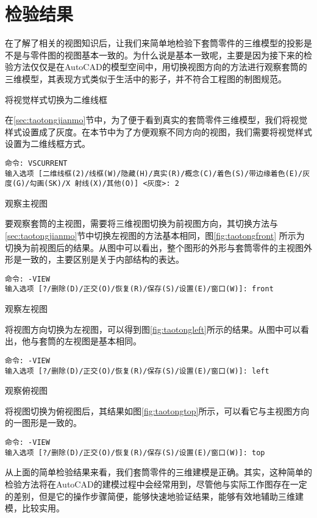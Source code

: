 \section{检验结果}

在了解了相关的视图知识后，让我们来简单地检验下套筒零件的三维模型的投影是不是与零件图的视图基本一致的。为什么说是基本一致呢，主要是因为接下来的检验方法仅仅是在AutoCAD的模型空间中，用切换视图方向的方法进行观察套筒的三维模型，其表现方式类似于生活中的影子，并不符合工程图的制图规范。

\begin{procedure}
\item 将视觉样式切换为二维线框

在\ref{sec:taotongjianmo}节中，为了便于看到真实的套筒零件三维模型，我们将视觉样式设置成了灰度。在本节中为了方便观察不同方向的视图，我们需要将视觉样式设置为二维线框方式。

\begin{lstlisting}
命令: VSCURRENT
输入选项 [二维线框(2)/线框(W)/隐藏(H)/真实(R)/概念(C)/着色(S)/带边缘着色(E)/灰度(G)/勾画(SK)/X 射线(X)/其他(O)] <灰度>: 2
\end{lstlisting}
\item 观察主视图

要观察套筒的主视图，需要将三维视图切换为前视图方向，其切换方法与\ref{sec:taotongjianmo}节中切换左视图的方法基本相同，图\ref{fig:taotongfront} 所示为切换为前视图后的结果。从图中可以看出，整个图形的外形与套筒零件的主视图外形是一致的，主要区别是关于内部结构的表达。

\begin{lstlisting}
命令: -VIEW
输入选项 [?/删除(D)/正交(O)/恢复(R)/保存(S)/设置(E)/窗口(W)]: front
\end{lstlisting}
\item 观察左视图

将视图方向切换为左视图，可以得到图\ref{fig:taotongleft}所示的结果。从图中可以看出，他与套筒的左视图是基本相同。
\begin{lstlisting}
命令: -VIEW
输入选项 [?/删除(D)/正交(O)/恢复(R)/保存(S)/设置(E)/窗口(W)]: left
\end{lstlisting}
\item 观察俯视图

将视图切换为俯视图后，其结果如图\ref{fig:taotongtop}所示，可以看它与主视图方向的一图形是一致的。
\begin{lstlisting}
命令: -VIEW
输入选项 [?/删除(D)/正交(O)/恢复(R)/保存(S)/设置(E)/窗口(W)]: top
\end{lstlisting}
\begin{figure}[htbp]
\hspace{15pt}
\hspace{15pt}
\end{figure}
\end{procedure}

从上面的简单检验结果来看，我们套筒零件的三维建模是正确。其实，这种简单的检验方法将在AutoCAD的建模过程中会经常用到，尽管他与实际工作图存在一定的差别，但是它的操作步骤简便，能够快速地验证结果，能够有效地辅助三维建模，比较实用。
\endinput